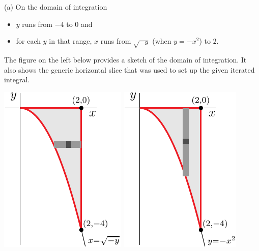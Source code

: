 \begin{solution}
(a)  On the domain of integration
\begin{itemize}
\item 
  $y$ runs from $-4$ to $0$ and
\item
  for each $y$ in that range, $x$ runs from $\sqrt{-y}$ (when $y=-x^2$)
  to $2$.
\end{itemize}
The figure on the left below provides a sketch of the domain of integration.
It also shows the generic horizontal slice that was used to set up the given 
iterated integral.

\begin{center}
     \includegraphics{fig/OE11D_5a.pdf}\qquad
     \includegraphics{fig/OE11D_5b.pdf}
\end{center}



\end{solution}
